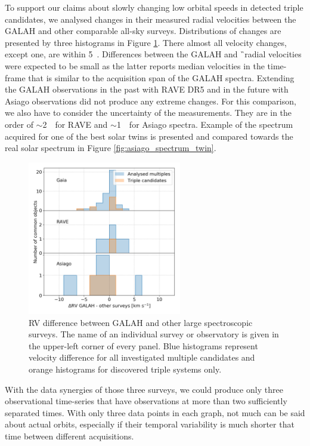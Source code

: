 To support our claims about slowly changing low orbital speeds in detected triple candidates, we analysed changes in their measured radial velocities between the GALAH and other comparable all-sky surveys. Distributions of changes are presented by three histograms in Figure \ref{fig:rv_survey}. There almost all velocity changes, except one, are within 5~\kms. Differences between the GALAH and \G\ radial velocities were expected to be small as the latter reports median velocities in the time-frame that is similar to the acquisition span of the GALAH spectra. Extending the GALAH observations in the past with RAVE DR5 \cite{2017AJ....153...75K} and in the future with Asiago observations did not produce any extreme changes. For this comparison, we also have to consider the uncertainty of the measurements. They are in the order of $\sim$2~\kms\ for RAVE and $\sim$1~\kms\ for Asiago spectra. Example of the spectrum acquired for one of the best solar twins is presented and compared towards the real solar spectrum in Figure \ref{fig:asiago_spectrum_twin}.

\begin{figure}
	\centering
	\includegraphics[width=0.6\textwidth]{guess_all_rv_diff.png}
	\caption{RV difference between GALAH and other large spectroscopic surveys. The name of an individual survey or observatory is given in the upper-left corner of every panel. Blue histograms represent velocity difference for all investigated multiple candidates and orange histograms for discovered triple systems only.}
	\label{fig:rv_survey}
\end{figure}

With the data synergies of those three surveys, we could produce only three observational time-series that have observations at more than two sufficiently separated times. With only three data points in each graph, not much can be said about actual orbits, especially if their temporal variability is much shorter that time between different acquisitions.

